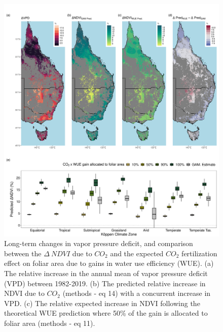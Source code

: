 \documentclass[
]{article}
\begin{document}
\clearpage
\begin{figure}
\includegraphics[width=14cm]{../../figures/Fig7_map_dVpd_gamCO2Pred_wueCO2Pred_dDifferenceBoxplot} \caption{Long-term changes in vapor pressure deficit, and comparison between the $\Delta~NDVI$ due to $CO_2$ and the expected $CO_2$ fertilization effect on foliar area due to gains in water use efficiency (WUE). (a) The relative increase in the annual mean of vapor pressure deficit (VPD) between 1982-2019. (b) The predicted relative increase in NDVI due to $CO_2$ (methods - eq 14) with a concurrent increase in VPD. (c) The relative expected increase in NDVI following the theoretical WUE prediction where 50\% of the gain is allocated to foliar area (methods - eq 11).}\label{fig:unnamed-chunk-6}
\end{figure}
\clearpage
\end{document}
